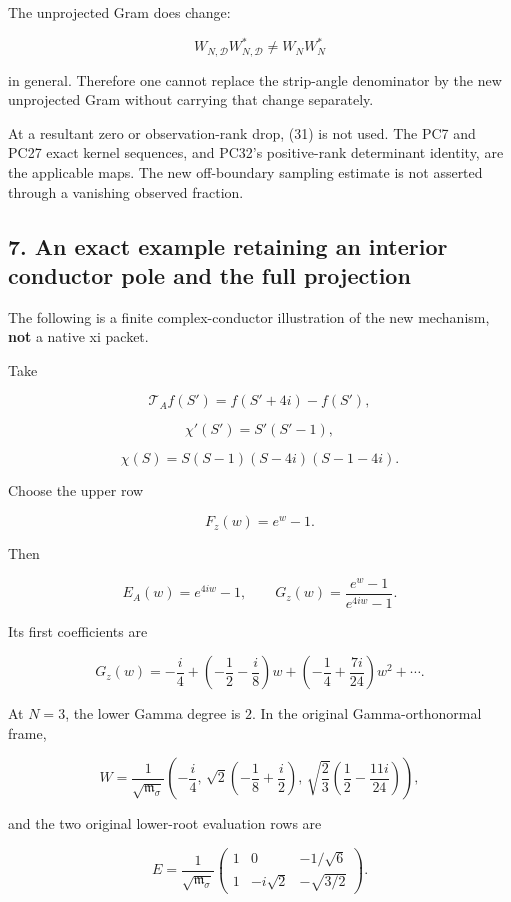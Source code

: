 \documentclass[11pt]{article}
\begin{document}
The unprojected Gram does change:

\[
W_{N,\mathcal D}W_{N,\mathcal D}^*
\ne W_NW_N^*
\]

in general. Therefore one cannot replace the strip-angle denominator by the new unprojected Gram without carrying that change separately.

At a resultant zero or observation-rank drop, (31) is not used. The PC7 and PC27 exact kernel sequences, and PC32's positive-rank determinant identity, are the applicable maps. The new off-boundary sampling estimate is not asserted through a vanishing observed fraction.

\subsection{7. An exact example retaining an interior conductor pole and the full projection}\label{an-exact-example-retaining-an-interior-conductor-pole-and-the-full-projection}

The following is a finite complex-conductor illustration of the new mechanism, \textbf{not} a native xi packet.

Take

\[
\mathcal T_Af(S')=f(S'+4i)-f(S'),
\]

\[
\chi'(S')=S'(S'-1),
\]

\[
\chi(S)=S(S-1)(S-4i)(S-1-4i).
\]

Choose the upper row

\[
F_z(w)=e^w-1.
\]

Then

\[
E_A(w)=e^{4iw}-1,\qquad
G_z(w)=\frac{e^w-1}{e^{4iw}-1}.
\]

Its first coefficients are

\[
G_z(w)
=
-\frac i4
+\left(-\frac12-\frac i8\right)w
+\left(-\frac14+\frac{7i}{24}\right)w^2+\cdots.
\]

At \(N=3\), the lower Gamma degree is \(2\). In the original Gamma-orthonormal frame,

\[
W=
\frac1{\sqrt{\mathfrak m_\sigma}}
\left(
-\frac i4,\,
\sqrt2\left(-\frac18+\frac i2\right),\,
\sqrt{\frac23}\left(\frac12-\frac{11i}{24}\right)
\right),
\]

and the two original lower-root evaluation rows are

\[
E=
\frac1{\sqrt{\mathfrak m_\sigma}}
\begin{pmatrix}
1&0&-1/\sqrt6\\
1&-i\sqrt2&-\sqrt{3/2}
\end{pmatrix}.
\]
\end{document}
